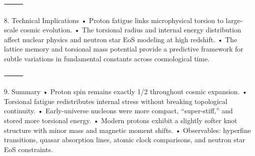 ⸻

8. Technical Implications
	•	Proton fatigue links microphysical torsion to large-scale cosmic evolution.
	•	The torsional radius and internal energy distribution affect nuclear physics and neutron star EoS modeling at high redshift.
	•	The lattice memory and torsional mass potential provide a predictive framework for subtle variations in fundamental constants across cosmological time.

⸻

9. Summary
	•	Proton spin remains exactly 1/2 throughout cosmic expansion.
	•	Torsional fatigue redistributes internal stress without breaking topological continuity.
	•	Early-universe nucleons were more compact, “super-stiff,” and stored more torsional energy.
	•	Modern protons exhibit a slightly softer knot structure with minor mass and magnetic moment shifts.
	•	Observables: hyperfine transitions, quasar absorption lines, atomic clock comparisons, and neutron star EoS constraints.
